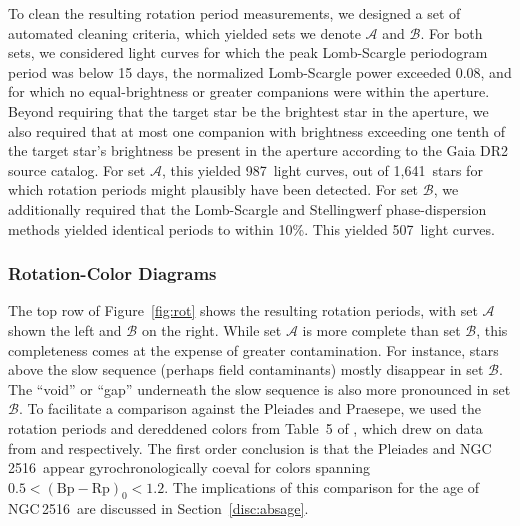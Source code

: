 \documentclass[12pt,twocolumn,tighten]{aastex63}
\newcommand{\cn}{NGC\,2516} %
\newcommand{\nautorotdenominator}{1{,}641} %
\newcommand{\nautorotnumerator}{987} %
\newcommand{\nautorotnumeratormatching}{507} %
\newcommand{\bpmrp}{(\mathrm{Bp}-\mathrm{Rp})_0}
\begin{document}
To clean the resulting rotation period measurements, we designed a set
of automated cleaning criteria, which yielded sets we denote
$\mathcal{A}$ and $\mathcal{B}$.  For both sets, we considered light
curves for which the peak Lomb-Scargle periodogram period was below 15
days, the normalized Lomb-Scargle power exceeded 0.08, and for which
no equal-brightness or greater companions were within the aperture.
Beyond requiring that the target star be the brightest star in the
aperture, we also required that at most one companion with brightness
exceeding one tenth of the target star's brightness be present in the
aperture according to the Gaia DR2 source catalog.  For set
$\mathcal{A}$, this yielded \nautorotnumerator\ light curves, out of
\nautorotdenominator\ stars for which rotation periods might plausibly
have been detected.  For set $\mathcal{B}$, we additionally required
that the Lomb-Scargle and Stellingwerf phase-dispersion methods
yielded identical periods to within 10\%.  This yielded
\nautorotnumeratormatching\ light curves. 

\subsubsection{Rotation-Color Diagrams}

The top row of Figure~\ref{fig:rot} shows the resulting rotation
periods, with set $\mathcal{A}$ shown the left and $\mathcal{B}$ on
the right.  While set $\mathcal{A}$ is more complete than set
$\mathcal{B}$, this completeness comes at the expense of greater
contamination.  For instance, stars above the slow sequence (perhaps
field contaminants) mostly disappear in set $\mathcal{B}$.  The
``void'' or ``gap'' underneath the slow sequence is also more
pronounced in set $\mathcal{B}$.  To facilitate a comparison against
the Pleiades and Praesepe, we used the rotation periods and dereddened
colors from Table~5 of \citet{curtis_rup147_2020}, which drew on data
from \citet{rebull_rotation_2016a} and \citet{douglas_k2_2019}
respectively.  The first order conclusion is that the Pleiades and
\cn\ appear gyrochronologically coeval for colors spanning
$0.5<\bpmrp<1.2$.  The implications of this comparison for the age of
\cn\ are discussed in Section~\ref{disc:absage}.
\end{document}
